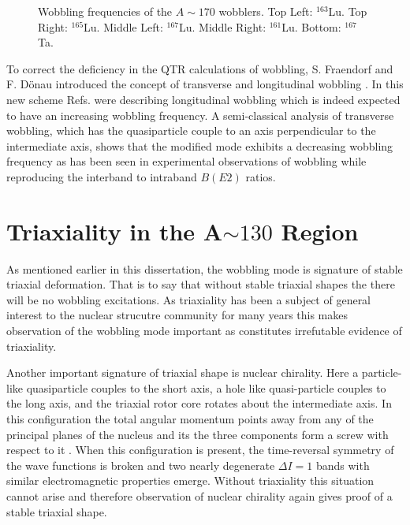 \begin{figure}[ht!]
	\caption{Wobbling frequencies of the $A\sim{}170$ wobblers. Top Left: $^{163}$Lu. Top Right: $^{165}$Lu. Middle Left: $^{167}$Lu. Middle Right: $^{161}$Lu. Bottom: $^{167}$Ta.\label{fig:chp4-old-wobb-freq}}
\end{figure}

To correct the deficiency in the QTR calculations of wobbling, S. Fraendorf and F. D\"onau introduced the concept of transverse and longitudinal wobbling \cite{frauendorfTransverseWobbling}. In this new scheme Refs. \cite{oldQTRWobblingTheory1,oldQTRWobblingTheory2,oldQTRWobblingTheory3,oldQTRWobblingTheory4} were describing longitudinal wobbling which is indeed expected to have an increasing wobbling frequency. A semi-classical analysis of transverse wobbling, which has the quasiparticle couple to an axis perpendicular to the intermediate axis, shows that the modified mode exhibits a decreasing wobbling frequency as has been seen in experimental observations of wobbling while reproducing the interband to intraband $B(E2)$ ratios.


\section{Triaxiality in the A$\sim{}130$ Region}
\label{sec:trw-triax}
As mentioned earlier in this dissertation, the wobbling mode is signature of stable triaxial deformation. That is to say that without stable triaxial shapes the there will be no wobbling excitations. As triaxiality has been a subject of general interest to the nuclear strucutre community for many years this makes observation of the wobbling mode important as constitutes irrefutable evidence of triaxiality. 

Another important signature of triaxial shape is nuclear chirality. Here a particle-like quasiparticle couples to the short axis, a hole like quasi-particle couples to the long axis, and the triaxial rotor core rotates about the intermediate axis. In this configuration the total angular momentum points away from any of the principal planes of the nucleus and its the three components form a screw with respect to it \cite{frauendorfChirality}. When this configuration is present, the time-reversal symmetry of the wave functions is broken and two nearly degenerate $\Delta{}I=1$ bands with similar electromagnetic properties emerge. Without triaxiality this situation cannot arise and therefore observation of nuclear chirality again gives proof of a stable triaxial shape.

